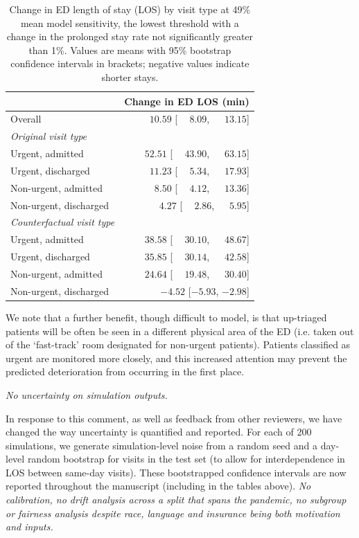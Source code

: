 \begin{table}[htbp]
\centering
\small
\caption{Change in ED length of stay (LOS) by visit type at 49\% mean model sensitivity, the lowest threshold with a change in the prolonged stay rate not significantly greater than 1\%. Values are means with 95\% bootstrap confidence intervals in brackets; negative values indicate shorter stays.}
\label{tab:los_visit_type_0.01}
\begin{tabular}{lr}
\toprule
 & Change in ED LOS (min) \\
\midrule
Overall & $\phantom{-}10.59$ [$\phantom{-}8.09$, $\phantom{-}13.15$] \\
\addlinespace
\textit{Original visit type} & \\
\quad Urgent, admitted & $\phantom{-}52.51$ [$\phantom{-}43.90$, $\phantom{-}63.15$] \\
\quad Urgent, discharged & $\phantom{-}11.23$ [$\phantom{-}5.34$, $\phantom{-}17.93$] \\
\quad Non-urgent, admitted & $\phantom{-}8.50$ [$\phantom{-}4.12$, $\phantom{-}13.36$] \\
\quad Non-urgent, discharged & $\phantom{-}4.27$ [$\phantom{-}2.86$, $\phantom{-}5.95$] \\
\addlinespace
\textit{Counterfactual visit type} & \\
\quad Urgent, admitted & $\phantom{-}38.58$ [$\phantom{-}30.10$, $\phantom{-}48.67$] \\
\quad Urgent, discharged & $\phantom{-}35.85$ [$\phantom{-}30.14$, $\phantom{-}42.58$] \\
\quad Non-urgent, admitted & $\phantom{-}24.64$ [$\phantom{-}19.48$, $\phantom{-}30.40$] \\
\quad Non-urgent, discharged & $-4.52$ [$-5.93$, $-2.98$] \\
\bottomrule
\end{tabular}
\end{table}


We note that a further benefit, though difficult to model, is that up-triaged patients will be often be seen in a different physical area of the ED (i.e. taken out of the `fast-track' room designated for non-urgent patients). Patients classified as urgent are monitored more closely, and this increased attention may prevent the predicted deterioration from occurring in the first place.

\textit{     No uncertainty on simulation outputs.}

In response to this comment, as well as feedback from other reviewers, we have changed the way uncertainty is quantified and reported. For each of 200 simulations, we generate simulation-level noise from a random seed and a day-level random bootstrap for visits in the test set (to allow for interdependence in LOS between same-day visits). These bootstrapped confidence intervals are now reported throughout the manuscript (including in the tables above).
\textit{
     No calibration, no drift analysis across a split that spans the pandemic, no subgroup or fairness analysis despite race, language and insurance being both motivation and inputs.}

